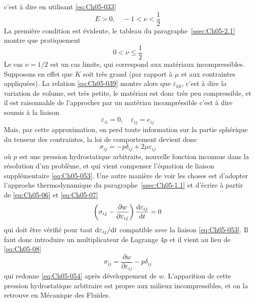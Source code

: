 c'est à dire en utilisant \eqref{eq:Ch05-033} 
\begin{equation}
    E>0, \quad -1 < \nu < \frac{1}{2}
    \label{eq:Ch05-051}
\end{equation}
La première condition est évidente, le tableau du paragraphe~\ref{ssec:Ch05-2.1} montre que pratiquement 
\begin{equation}
    0 < \nu \leq \frac{1}{2}
    \label{eq:Ch05-052}
\end{equation}
Le cas $\nu = 1/2$ est un cas limite, qui correspond aux matériaux incompressibles.
Supposons en effet que $K$ soit très grand (par rapport à $\mu$ et aux contraintes appliquées).
La relation \eqref{eq:Ch05-039} montre alors que $\varepsilon_{kk}$, c'est à dire la variation de volume, est très petite, le matériau est donc très peu compressible, et il est raisonnahle de l'approcher par un matériau incompréssible c'est à dire soumis à la liaison 
\begin{equation}
    \varepsilon_{ii} = 0, \quad \varepsilon_{ij} = e_{ij}
    \label{eq:Ch05-053}
\end{equation}
Mais, par cette approximation, on perd toute information sur la partie sphérique du tenseur des contraintes, la loi de comportement devient donc 
\begin{equation}
    \sigma_{ij} = -p \delta_{ij} + 2 \mu \varepsilon_{ij}
    \label{eq:Ch05-054}
\end{equation}
où $p$ est une pression hydrostatique arbitraite, nouvelle fonction inconnue dans la résolution d'un problème, et qui vient compenser l'équation de liaison supplémentaire \eqref{eq:Ch05-053}.
Une autre manière de voir les choses est d'adopter l'approche thermodynamique du paragraphe~\ref{ssec:Ch05-1.1} et d'écrire à partir de \eqref{eq:Ch05-06} et \eqref{eq:Ch05-07} 
\begin{equation}
    \left( \sigma_{ij} - \frac{\partial w}{\partial \varepsilon_{ij}} \right) \frac{\mathrm{d} \varepsilon_{ij}}{\mathrm{d} t} = 0
    \label{eq:Ch05-055}
\end{equation}
qui doit être vérifié pour taut $\mathrm{d} \varepsilon_{ij} / \mathrm{d} t$ compatible avec la liaison \eqref{eq:Ch05-053}. 
Il faut donc introduire un multiplicateur de Lagrange $4p$ et il vient au lieu de \eqref{eq:Ch05-08} 
\begin{equation}
    \sigma_{ij} = \frac{\partial w}{\partial \varepsilon_{ij}} -p\delta_{ij}
    \label{eq:Ch05-056}
\end{equation}
qui redonne \eqref{eq:Ch05-054} après développement de $w$.
L'apparition de cette pression hydrostatique arbitraire est propre aux milieux incompressibles, et on la retrouve en Mécanique des Fluides.

